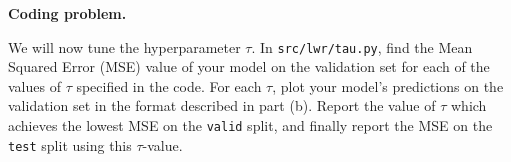 \item {} \textbf{Coding problem.}

We will now tune the hyperparameter $\tau$.
In \texttt{src/lwr/tau.py}, find the Mean Squared Error (MSE) value of your model on the
validation set for each of the values of $\tau$ specified in the code. For each
$\tau$, plot your model's predictions on the validation set in the format
described in part (b). Report the value of $\tau$ which achieves the lowest MSE
on the \texttt{valid} split, and finally report the MSE on the \texttt{test}
split using this $\tau$-value.
